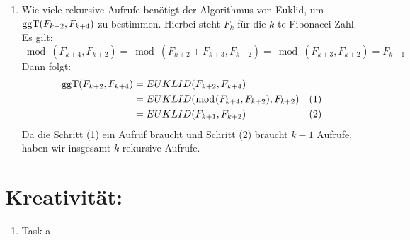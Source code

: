 \begin{enumerate}[label=(\alph*)]
        \item Wie viele rekursive Aufrufe benötigt der Algorithmus von Euklid, um $\operatorname{ggT}(F_{k+2},F_{k+4})$
		zu bestimmen. Hierbei steht $F_k$ für die $k$-te Fibonacci-Zahl.
		Es gilt:
		\[\bmod(F_{k+4},F_{k+2}) = \bmod(F_{k+2} + F_{k+3},F_{k+2}) = \bmod(F_{k+3},F_{k+2}) = F_{k+1}\]
		Dann folgt:
		\begin{align*}
			\operatorname{ggT}(F_{k+2},F_{k+4}) &= EUKLID(F_{k+2},F_{k+4}) \\
			 &= EUKLID(\bmod(F_{k+4},F_{k+2}),F_{k+2}) &(1) \\ 
			 &= EUKLID(F_{k+1},F_{k+2}) &(2)
		\end{align*}
		Da die Schritt (1) ein Aufruf braucht und Schritt (2) braucht $k-1$ Aufrufe, haben wir insgesamt
		$k$ rekursive Aufrufe.

    \end{enumerate}
    \section*{Kreativität:}
    \begin{enumerate}[label=(\alph*)]
    	\item Task a
    \end{enumerate}
